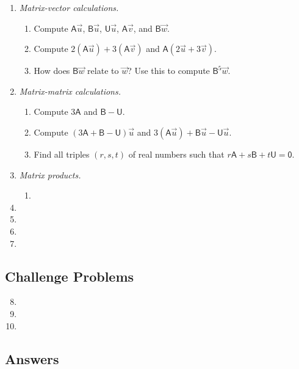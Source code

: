 \begin{enumerate}
\item \emph{Matrix-vector calculations.}
\begin{enumerate}
\item Compute $\mathsf{A}\vec{u}$, $\mathsf{B}\vec{u}$, $\mathsf{U}\vec{u}$, $\mathsf{A}\vec{v}$, and $\mathsf{B}\vec{w}$.
\item Compute $2(\mathsf{A}\vec{u}) + 3(\mathsf{A}\vec{v})$ and $\mathsf{A}(2\vec{u} + 3\vec{v})$.
\item How does $\mathsf{B}\vec{w}$ relate to $\vec{w}$? Use this to compute $\mathsf{B}^5\vec{w}$.
\end{enumerate}
\item \emph{Matrix-matrix calculations.}
\begin{enumerate}
\item Compute $3\mathsf{A}$ and $\mathsf{B} - \mathsf{U}$.
\item Compute $(3\mathsf{A} + \mathsf{B} - \mathsf{U})\vec{u}$ and $3(\mathsf{A}\vec{u}) + \mathsf{B}\vec{u} - \mathsf{U}\vec{u}$.
\item Find all triples $(r,s,t)$ of real numbers such that $r\mathsf{A} + s\mathsf{B} + t\mathsf{U} = \mathsf{0}$.
\end{enumerate}
\item \emph{Matrix products.}
\begin{enumerate}
\item 
\end{enumerate}
\item %
\item %
\item %
\item %
\end{enumerate}


\newpage
\subsection{Challenge Problems}

\begin{enumerate}\setcounter{enumi}{7}
\item %
\item %
\item %
\end{enumerate}


\newpage
\subsection{Answers}